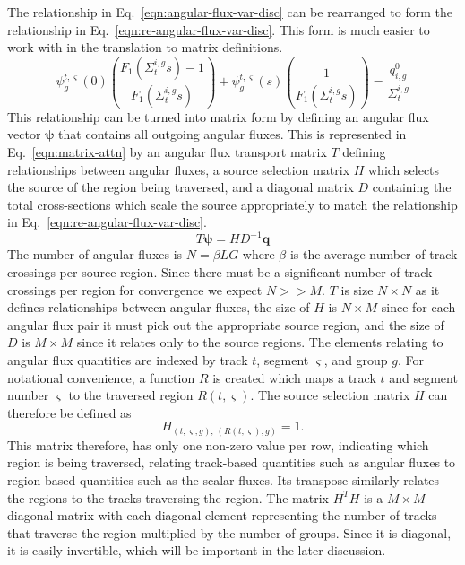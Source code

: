 The relationship in Eq.~\ref{eqn:angular-flux-var-disc} can be rearranged to form the relationship in Eq.~\ref{eqn:re-angular-flux-var-disc}. This form is much easier to work with in the translation to matrix definitions.
\begin{equation}
 \psi^{t,\varsigma}_g(0) \left(\frac{F_1\left(\Sigma_{t}^{i,g} s \right) - 1}{F_1\left(\Sigma_{t}^{i,g} s \right)}\right) + \psi_g^{t,\varsigma}(s) \left(\frac{1}{F_1\left(\Sigma_{t}^{i,g} s \right)}\right) = \frac{q^0_{i,g}}{\Sigma_{t}^{i,g}}
\label{eqn:re-angular-flux-var-disc}
\end{equation}
This relationship can be turned into matrix form by defining an angular flux vector $\boldsymbol{\psi}$ that contains all outgoing angular fluxes. This is represented in Eq.~\ref{eqn:matrix-attn} by an angular flux transport matrix $T$ defining relationships between angular fluxes, a source selection matrix $H$ which selects the source of the region being traversed, and a diagonal matrix $D$ containing the total cross-sections which scale the source appropriately to match the relationship in Eq.~\ref{eqn:re-angular-flux-var-disc}.
\begin{equation}
T \boldsymbol{\psi} = H D^{-1} \mathbf{q}
\label{eqn:matrix-attn}
\end{equation}
The number of angular fluxes is $N = \beta L G$ where $\beta$ is the average number of track crossings per source region. Since there must be a significant number of track crossings per region for convergence we expect $N >> M$. $T$ is size $N \times N$ as it defines relationships between angular fluxes, the size of $H$ is $N \times M$ since for each angular flux pair it must pick out the appropriate source region, and the size of $D$ is $M \times M$ since it relates only to the source regions. The elements relating to angular flux quantities are indexed by track $t$, segment $\varsigma$, and group $g$. For notational convenience, a function $R$ is created which maps a track $t$ and segment number $\varsigma$ to the traversed region $R(t,\varsigma)$. The source selection matrix $H$ can therefore be defined as
\begin{equation}
H_{\left(t,\varsigma,g\right), \, \left(R(t,\varsigma), g\right)} = 1.
\label{eqn:source-selection-matrix}
\end{equation}
This matrix therefore, has only one non-zero value per row, indicating which region is being traversed, relating track-based quantities such as angular fluxes to region based quantities such as the scalar fluxes. Its transpose similarly relates the regions to the tracks traversing the region. The matrix $H^T H$ is a $M \times M$ diagonal matrix with each diagonal element representing the number of tracks that traverse the region multiplied by the number of groups. Since it is diagonal, it is easily invertible, which will be important in the later discussion.
